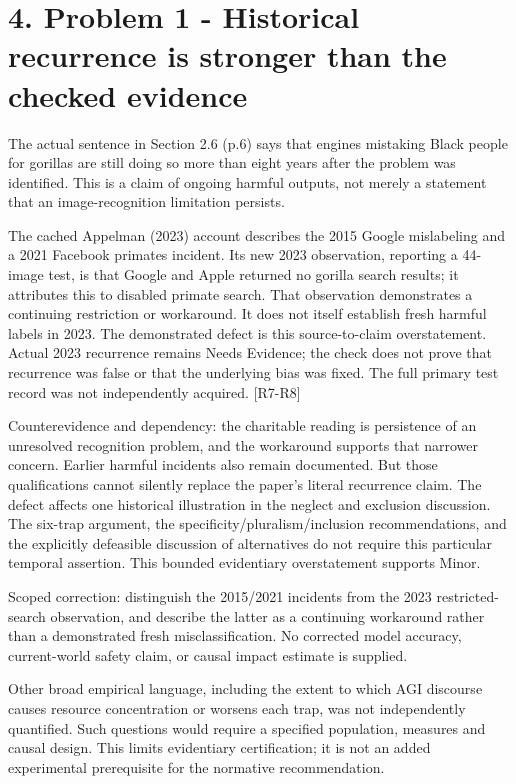 \documentclass[10pt]{article}
\begin{document}
\section*{4. Problem 1 - Historical recurrence is stronger than the checked evidence}
The actual sentence in Section 2.6 (p.6) says that engines mistaking Black people for gorillas are still doing so more than eight years after the problem was identified. This is a claim of ongoing harmful outputs, not merely a statement that an image-recognition limitation persists.\par
The cached Appelman (2023) account describes the 2015 Google mislabeling and a 2021 Facebook primates incident. Its new 2023 observation, reporting a 44-image test, is that Google and Apple returned no gorilla search results; it attributes this to disabled primate search. That observation demonstrates a continuing restriction or workaround. It does not itself establish fresh harmful labels in 2023. The demonstrated defect is this source-to-claim overstatement. Actual 2023 recurrence remains Needs Evidence; the check does not prove that recurrence was false or that the underlying bias was fixed. The full primary test record was not independently acquired. [R7-R8]\par
Counterevidence and dependency: the charitable reading is persistence of an unresolved recognition problem, and the workaround supports that narrower concern. Earlier harmful incidents also remain documented. But those qualifications cannot silently replace the paper’s literal recurrence claim. The defect affects one historical illustration in the neglect and exclusion discussion. The six-trap argument, the specificity/pluralism/inclusion recommendations, and the explicitly defeasible discussion of alternatives do not require this particular temporal assertion. This bounded evidentiary overstatement supports Minor.\par
Scoped correction: distinguish the 2015/2021 incidents from the 2023 restricted-search observation, and describe the latter as a continuing workaround rather than a demonstrated fresh misclassification. No corrected model accuracy, current-world safety claim, or causal impact estimate is supplied.\par
Other broad empirical language, including the extent to which AGI discourse causes resource concentration or worsens each trap, was not independently quantified. Such questions would require a specified population, measures and causal design. This limits evidentiary certification; it is not an added experimental prerequisite for the normative recommendation.\par
\end{document}
